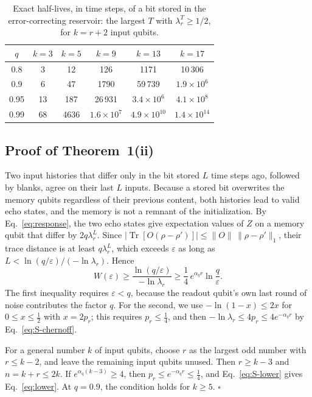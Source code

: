 \documentclass[aps,prl,twocolumn,superscriptaddress,floatfix]{revtex4-2}
\theoremstyle{plain}
\newcommand{\tr}{\operatorname{Tr}}
\newcommand{\Norm}[1]{\lVert #1\rVert}
\begin{document}
\begin{table}[t]
\caption{Exact half-lives, in time steps, of a bit stored in the error-correcting reservoir: the largest $T$ with $\lambda_r^T\ge1/2$, for $k=r+2$ input qubits.}
\label{tabS:halflife}
\begin{ruledtabular}
\begin{tabular}{cccccc}
$q$ & $k=3$ & $k=5$ & $k=9$ & $k=13$ & $k=17$ \\ \hline
0.8 & 3 & 12 & 126 & 1171 & 10\,306 \\
0.9 & 6 & 47 & 1790 & 59\,739 & $1.9\times10^{6}$ \\
0.95 & 13 & 187 & 26\,931 & $3.4\times10^{6}$ & $4.1\times10^{8}$ \\
0.99 & 68 & 4636 & $1.6\times10^{7}$ & $4.9\times10^{10}$ & $1.4\times10^{14}$ \\
\end{tabular}
\end{ruledtabular}
\end{table}

\subsection{Proof of Theorem~1(ii)}
\label{sm:lowerbound}

Two input histories that differ only in the bit stored $L$ time steps ago, followed by blanks, agree on their last $L$ inputs. Because a stored bit overwrites the memory qubits regardless of their previous content, both histories lead to valid echo states, and the memory is not a remnant of the initialization. By Eq.~\eqref{eq:response}, the two echo states give expectation values of $Z$ on a memory qubit that differ by $2q\lambda_r^L$. Since $|\tr[O(\rho-\rho')]|\le\Norm O\,\Norm{\rho-\rho'}_1$, their trace distance is at least $q\lambda_r^L$, which exceeds $\varepsilon$ as long as $L<\ln(q/\varepsilon)/(-\ln\lambda_r)$. Hence
\begin{equation}
W(\varepsilon)\ge\frac{\ln(q/\varepsilon)}{-\ln\lambda_r}\ge\frac14\,e^{\alpha_qr}\ln\frac q\varepsilon .
\label{eq:S-lower}
\end{equation}
The first inequality requires $\varepsilon<q$, because the readout qubit's own last round of noise contributes the factor $q$. For the second, we use $-\ln(1-x)\le2x$ for $0\le x\le\frac12$ with $x=2p_r$; this requires $p_r\le\frac14$, and then $-\ln\lambda_r\le4p_r\le4e^{-\alpha_qr}$ by Eq.~\eqref{eq:S-chernoff}.

For a general number $k$ of input qubits, choose $r$ as the largest odd number with $r\le k-2$, and leave the remaining input qubits unused. Then $r\ge k-3$ and $n=k+r\le2k$. If $e^{\alpha_q(k-3)}\ge4$, then $p_r\le e^{-\alpha_qr}\le\frac14$, and Eq.~\eqref{eq:S-lower} gives Eq.~\eqref{eq:lower}. At $q=0.9$, the condition holds for $k\ge5$. \hfill$\square$
\end{document}
